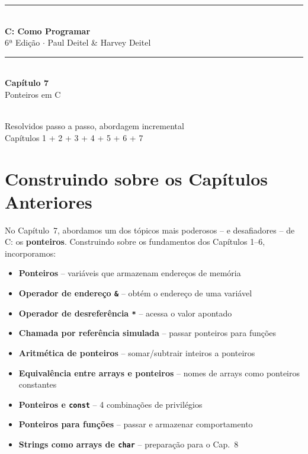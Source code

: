 \documentclass[12pt,a4paper]{article}
\begin{document}
\begin{titlepage}
  \centering\vspace*{2cm}
  {\color{deitelblue}\rule{\linewidth}{2pt}}\\[0.4cm]
  {\huge\bfseries\color{deitelblue}C: Como Programar}\\[0.2cm]
  {\large\color{deitelblue}6ª Edição $\cdot$ Paul Deitel \& Harvey Deitel}\\[0.2cm]
  {\color{deitelblue}\rule{\linewidth}{2pt}}\\[1cm]
  {\LARGE\bfseries Capítulo 7}\\[0.3cm]
  {\Large\color{deitelblue!80}Ponteiros em C}\\[0.8cm]
  \begin{tcolorbox}[colback=deitellightblue,colframe=deitelblue,width=0.85\linewidth]
    \\[0.2cm]
    {\normalsize Resolvidos passo a passo, abordagem incremental\\
    Capítulos 1 + 2 + 3 + 4 + 5 + 6 + 7}
  \end{tcolorbox}
\end{titlepage}

\section*{Construindo sobre os Capítulos Anteriores}

No Capítulo~7, abordamos um dos tópicos mais poderosos -- e desafiadores -- de C:
os \textbf{ponteiros}. Construindo sobre os fundamentos dos Capítulos 1--6, incorporamos:

\begin{itemize}[noitemsep]
  \item \textbf{Ponteiros} -- variáveis que armazenam endereços de memória
  \item \textbf{Operador de endereço \texttt{\&}} -- obtém o endereço de uma variável
  \item \textbf{Operador de desreferência \texttt{*}} -- acessa o valor apontado
  \item \textbf{Chamada por referência simulada} -- passar ponteiros para funções
  \item \textbf{Aritmética de ponteiros} -- somar/subtrair inteiros a ponteiros
  \item \textbf{Equivalência entre arrays e ponteiros} -- nomes de arrays como ponteiros constantes
  \item \textbf{Ponteiros e \texttt{const}} -- 4 combinações de privilégios
  \item \textbf{Ponteiros para funções} -- passar e armazenar comportamento
  \item \textbf{Strings como arrays de \texttt{char}} -- preparação para o Cap.~8
\end{itemize}
\end{document}
